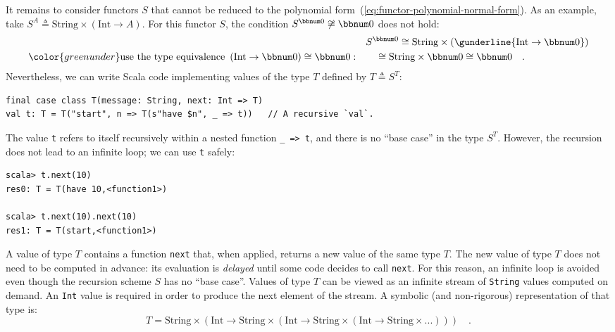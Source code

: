 It remains to consider functors $S$ that cannot be reduced to the
polynomial form~(\ref{eq:functor-polynomial-normal-form}). As an
example, take $S^{A}\triangleq\text{String}\times(\text{Int}\rightarrow A)$.
For this functor $S$, the condition $S^{\bbnum 0}\not\cong\bbnum 0$
does not hold:
\begin{align*}
 & S^{\bbnum 0}\cong\text{String}\times(\gunderline{\text{Int}\rightarrow\bbnum 0})\\
{\color{greenunder}\text{use the type equivalence }\left(\text{Int}\rightarrow\bbnum 0\right)\cong\bbnum 0:}\quad & \quad\cong\text{String}\times\bbnum 0\cong\bbnum 0\quad.
\end{align*}
Nevertheless, we can write Scala code implementing values of the type
$T$ defined by $T\triangleq S^{T}$:
\begin{lstlisting}
final case class T(message: String, next: Int => T)
val t: T = T("start", n => T(s"have $n", _ => t))   // A recursive `val`.
\end{lstlisting}
The value \lstinline!t! refers to itself recursively within a nested
function \lstinline!_ => t!, and there is no \textsf{``}base case\textsf{''} in the
type $S^{T}$. However, the recursion does not lead to an infinite
loop; we can use \lstinline!t! safely:
\begin{lstlisting}
scala> t.next(10)
res0: T = T(have 10,<function1>)

scala> t.next(10).next(10)
res1: T = T(start,<function1>)
\end{lstlisting}
A value of type $T$ contains a function \lstinline!next! that, when
applied, returns a new value of the same type $T$. The new value
of type $T$ does not need to be computed in advance: its evaluation
is \emph{delayed} until some code decides to call \lstinline!next!.
For this reason, an infinite loop is avoided even though the recursion
scheme $S$ has no \textsf{``}base case\textsf{''}. Values of type $T$ can be viewed
as an infinite stream of \lstinline!String! values computed on demand.
An \lstinline!Int! value is required in order to produce the next
element of the stream. A symbolic (and non-rigorous) representation
of that type is:
\[
T=\text{String}\times(\text{Int}\rightarrow\text{String}\times(\text{Int}\rightarrow\text{String}\times(\text{Int}\rightarrow\text{String}\times...)))\quad.
\]


